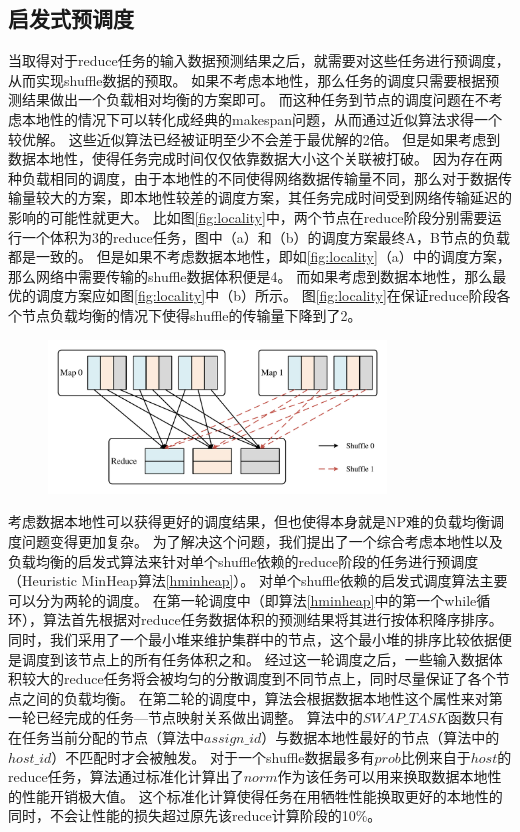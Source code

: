 \subsection{启发式预调度}
\label{subsec:schedule}

当取得对于reduce任务的输入数据预测结果之后，就需要对这些任务进行预调度，从而实现shuffle数据的预取。
如果不考虑本地性，那么任务的调度只需要根据预测结果做出一个负载相对均衡的方案即可。
而这种任务到节点的调度问题在不考虑本地性的情况下可以转化成经典的makespan问题，从而通过近似算法求得一个较优解\cite{approximation}。
这些近似算法已经被证明至少不会差于最优解的2倍。
但是如果考虑到数据本地性，使得任务完成时间仅仅依靠数据大小这个关联被打破。
因为存在两种负载相同的调度，由于本地性的不同使得网络数据传输量不同，那么对于数据传输量较大的方案，即本地性较差的调度方案，其任务完成时间受到网络传输延迟的影响的可能性就更大。
比如图\ref{fig:locality}中，两个节点在reduce阶段分别需要运行一个体积为3的reduce任务，图中（a）和（b）的调度方案最终A，B节点的负载都是一致的。
但是如果不考虑数据本地性，即如\ref{fig:locality}（a）中的调度方案，那么网络中需要传输的shuffle数据体积便是4。
而如果考虑到数据本地性，那么最优的调度方案应如图\ref{fig:locality}中（b）所示。
图\ref{fig:locality}在保证reduce阶段各个节点负载均衡的情况下使得shuffle的传输量下降到了2。

\begin{figure}[!htp]
    \centering
    \includegraphics[width=0.8\textwidth]{../figure/twoshuffles.pdf}
\end{figure}

考虑数据本地性可以获得更好的调度结果，但也使得本身就是NP难的负载均衡调度问题变得更加复杂。
为了解决这个问题，我们提出了一个综合考虑本地性以及负载均衡的启发式算法来针对单个shuffle依赖的reduce阶段的任务进行预调度（Heuristic MinHeap算法\ref{hminheap}）。
对单个shuffle依赖的启发式调度算法主要可以分为两轮的调度。
在第一轮调度中（即算法\ref{hminheap}中的第一个while循环），算法首先根据对reduce任务数据体积的预测结果将其进行按体积降序排序。
同时，我们采用了一个最小堆来维护集群中的节点，这个最小堆的排序比较依据便是调度到该节点上的所有任务体积之和。
经过这一轮调度之后，一些输入数据体积较大的reduce任务将会被均匀的分散调度到不同节点上，同时尽量保证了各个节点之间的负载均衡。
在第二轮的调度中，算法会根据数据本地性这个属性来对第一轮已经完成的任务---节点映射关系做出调整。
算法中的$SWAP\_TASK$函数只有在任务当前分配的节点（算法中$assign\_id$）与数据本地性最好的节点（算法中的$host\_id$）不匹配时才会被触发。
对于一个shuffle数据最多有$prob$比例来自于$host$的reduce任务，算法通过标准化计算出了$norm$作为该任务可以用来换取数据本地性的性能开销极大值。
这个标准化计算使得任务在用牺牲性能换取更好的本地性的同时，不会让性能的损失超过原先该reduce计算阶段的10\%。

